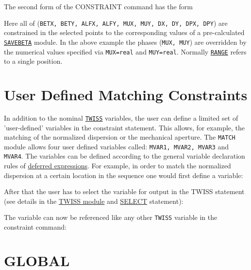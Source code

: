 The second form of the CONSTRAINT command has the form

Here all of (\texttt{BETX, BETY, ALFX, ALFY, MUX, MUY, DX, DY, DPX, DPY})
are constrained in the selected points to the corresponding values
of a pre-calculated \hyperref[sec:savebeta]{\texttt{SAVEBETA}} module.
In the above example the phases (\texttt{MUX, MUY}) are overridden by the 
numerical values specified via \texttt{MUX=real} and \texttt{MUY=real}.
Normally \hyperref[sec:range]{\texttt{RANGE}} refers to a single position.

\section{User Defined Matching Constraints}
\label{sec:userconstraint}

In addition to the nominal \hyperref[chap:twiss]{\texttt{TWISS}} variables, 
the user can define a limited set of 'user-defined' variables in the
constraint statement.
This allows, for example, the matching of the normalized dispersion or the
mechanical aperture. The \texttt{MATCH} module allows four user defined
variables called: \texttt{MVAR1, MVAR2, MVAR3} and \texttt{MVAR4}. 
The variables can be defined according to the general variable
declaration rules of \hyperref[sec:defer]{deferred expressions}.
For example, in order to match the normalized dispersion at a certain
location in the sequence one would first define a variable:


After that the user has to select the variable for output in the TWISS
statement (see details in the \hyperref[chap:twiss]{TWISS module} and 
\hyperref[sec:select]{SELECT} statement):

The variable can now be referenced like any other \texttt{TWISS} variable
in the constraint command:

\section{GLOBAL}
\label{sec:global}

